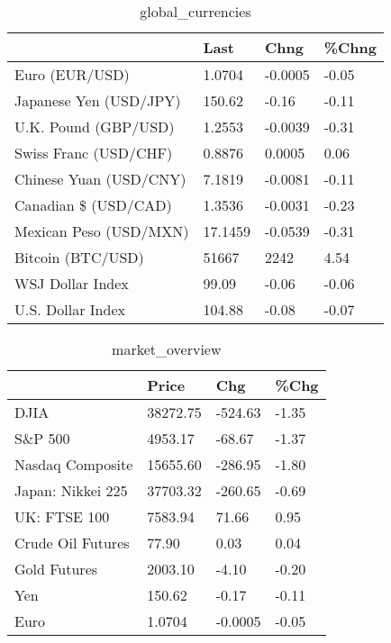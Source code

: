 \documentclass{article}%
\begin{document}
%


\begin{table}[htbp]%
\caption{global\_currencies}%
\centering%
\begin{adjustbox}{width=1\textwidth}%
\begin{tabular}{llll}
\toprule
                       &    Last &    Chng & \%Chng \\
\midrule
        Euro (EUR/USD) &  1.0704 & -0.0005 & -0.05 \\
Japanese Yen (USD/JPY) &  150.62 &   -0.16 & -0.11 \\
  U.K. Pound (GBP/USD) &  1.2553 & -0.0039 & -0.31 \\
 Swiss Franc (USD/CHF) &  0.8876 &  0.0005 &  0.06 \\
Chinese Yuan (USD/CNY) &  7.1819 & -0.0081 & -0.11 \\
  Canadian \$ (USD/CAD) &  1.3536 & -0.0031 & -0.23 \\
Mexican Peso (USD/MXN) & 17.1459 & -0.0539 & -0.31 \\
     Bitcoin (BTC/USD) &   51667 &    2242 &  4.54 \\
      WSJ Dollar Index &   99.09 &   -0.06 & -0.06 \\
     U.S. Dollar Index &  104.88 &   -0.08 & -0.07 \\
\bottomrule
\end{tabular}
%
\end{adjustbox}%
\end{table}

%


\begin{table}[htbp]%
\caption{market\_overview}%
\centering%
\begin{adjustbox}{width=1\textwidth}%
\begin{tabular}{llll}
\toprule
                  &    Price &     Chg &  \%Chg \\
\midrule
             DJIA & 38272.75 & -524.63 & -1.35 \\
          S\&P 500 &  4953.17 &  -68.67 & -1.37 \\
 Nasdaq Composite & 15655.60 & -286.95 & -1.80 \\
Japan: Nikkei 225 & 37703.32 & -260.65 & -0.69 \\
     UK: FTSE 100 &  7583.94 &   71.66 &  0.95 \\
Crude Oil Futures &    77.90 &    0.03 &  0.04 \\
     Gold Futures &  2003.10 &   -4.10 & -0.20 \\
              Yen &   150.62 &   -0.17 & -0.11 \\
             Euro &   1.0704 & -0.0005 & -0.05 \\
\bottomrule
\end{tabular}
%
\end{adjustbox}%
\end{table}

%
\end{document}
